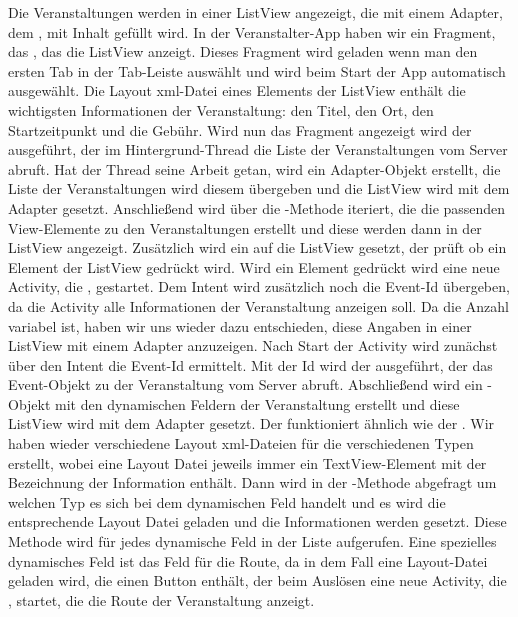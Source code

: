 Die Veranstaltungen werden in einer ListView angezeigt, die mit einem Adapter, dem , mit Inhalt gefüllt wird. In der Veranstalter-App haben wir ein Fragment, das , das die ListView anzeigt. Dieses Fragment wird geladen wenn man den ersten Tab in der Tab-Leiste auswählt und wird beim Start der App automatisch ausgewählt. Die Layout xml-Datei eines Elements der ListView enthält die wichtigsten Informationen der Veranstaltung: den Titel, den Ort, den Startzeitpunkt und die Gebühr. Wird nun das Fragment angezeigt wird der  ausgeführt, der im Hintergrund-Thread die Liste der Veranstaltungen vom Server abruft. Hat der Thread seine Arbeit getan, wird ein Adapter-Objekt erstellt, die Liste der Veranstaltungen wird diesem übergeben und die ListView wird mit dem Adapter gesetzt. Anschließend wird über die -Methode iteriert, die die passenden View-Elemente zu den Veranstaltungen erstellt und diese werden dann in der ListView angezeigt. Zusätzlich wird ein  auf die ListView gesetzt, der prüft ob ein Element der ListView gedrückt wird. Wird ein Element gedrückt wird eine neue Activity, die , gestartet. Dem Intent wird zusätzlich noch die Event-Id übergeben, da die Activity alle Informationen der Veranstaltung anzeigen soll. Da die Anzahl variabel ist, haben wir uns wieder dazu entschieden, diese Angaben in einer ListView mit einem Adapter anzuzeigen. Nach Start der Activity wird zunächst über den Intent die Event-Id ermittelt. Mit der Id wird der  ausgeführt, der das Event-Objekt zu der Veranstaltung vom Server abruft. Abschließend wird ein -Objekt mit den dynamischen Feldern der Veranstaltung erstellt und diese ListView wird mit dem Adapter gesetzt. Der  funktioniert ähnlich wie der . Wir haben wieder verschiedene Layout xml-Dateien für die verschiedenen Typen erstellt, wobei eine Layout Datei jeweils immer ein TextView-Element mit der Bezeichnung der Information enthält. Dann wird in der -Methode abgefragt um welchen Typ es sich bei dem dynamischen Feld handelt und es wird die entsprechende Layout Datei geladen und die Informationen werden gesetzt. Diese Methode wird für jedes dynamische Feld in der Liste aufgerufen. Eine spezielles dynamisches Feld ist das Feld für die Route, da in dem Fall eine Layout-Datei geladen wird, die einen Button enthält, der beim Auslösen eine neue Activity, die , startet, die die Route der Veranstaltung anzeigt. 

